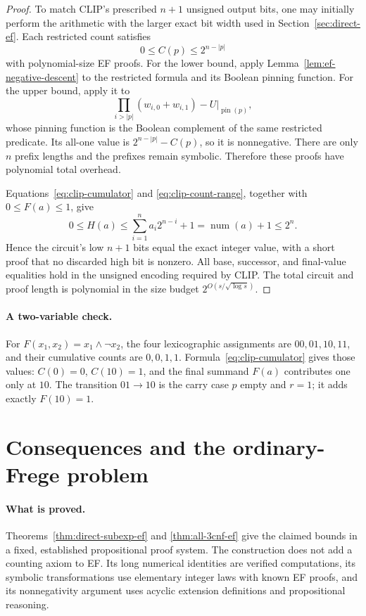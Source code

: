 \documentclass[11pt]{article}
\theoremstyle{definition}
\theoremstyle{remark}
\begin{document}
\begin{proof}
To match CLIP's prescribed $n+1$ unsigned output bits, one may
initially perform the arithmetic with the larger exact bit width
used in Section~\ref{sec:direct-ef}. Each restricted count satisfies
\[
 0\le C(p)\le2^{n-|p|}
 \tag{\thesection.3}\label{eq:clip-count-range}
\]
with polynomial-size EF proofs. For the lower bound, apply
Lemma~\ref{lem:ef-negative-descent} to the restricted formula and
its Boolean pinning function. For the upper bound, apply it to
\[
 \prod_{i>|p|}(w_{i,0}+w_{i,1})-U|_{\operatorname{pin}(p)},
\]
whose pinning function is the Boolean complement of the same
restricted predicate. Its all-one value is
$2^{n-|p|}-C(p)$, so it is nonnegative. There are only $n$ prefix
lengths and the prefixes remain symbolic. Therefore these proofs
have polynomial total overhead.

Equations~\eqref{eq:clip-cumulator} and
\eqref{eq:clip-count-range}, together with $0\le F(a)\le1$, give
\[
 0\le H(a)\le\sum_{i=1}^n a_i2^{n-i}+1
            =\operatorname{num}(a)+1\le2^n.
\]
Hence the circuit's low $n+1$ bits equal the exact integer value,
with a short proof that no discarded high bit is nonzero. All
base, successor, and final-value equalities hold in the unsigned
encoding required by CLIP. The total circuit and proof length is
polynomial in the size budget $2^{O(s/\sqrt{\log s})}$.
\end{proof}

\paragraph{A two-variable check.}
For $F(x_1,x_2)=x_1\wedge\neg x_2$, the four lexicographic
assignments are $00,01,10,11$, and their cumulative counts are
$0,0,1,1$. Formula~\eqref{eq:clip-cumulator} gives those values:
$C(0)=0$, $C(10)=1$, and the final summand $F(a)$ contributes
one only at $10$. The transition $01\to10$ is the carry case
$p$ empty and $r=1$; it adds exactly $F(10)=1$.


\section{Consequences and the ordinary-Frege problem}
\label{sec:ef-boundaries}

\paragraph{What is proved.}
Theorems~\ref{thm:direct-subexp-ef} and
\ref{thm:all-3cnf-ef} give the claimed bounds in a fixed,
established propositional proof system. The construction does not
add a counting axiom to EF. Its long numerical identities are
verified computations, its symbolic transformations use elementary
integer laws with known EF proofs, and its nonnegativity argument
uses acyclic extension definitions and propositional reasoning.
\end{document}
